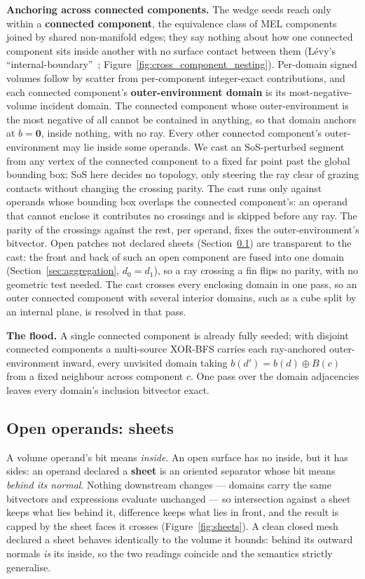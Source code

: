 \documentclass{egpubl}
\begin{document}
\textbf{Anchoring across connected components.} The wedge seeds reach only within a \textbf{connected component}, the equivalence class of MEL components joined by shared non-manifold edges; they say nothing about how one connected component sits inside another with no surface contact between them (L\'evy's ``internal-boundary''~\cite{Levy2025}; Figure~\ref{fig:cross_component_nesting}). Per-domain signed volumes follow by scatter from per-component integer-exact contributions, and each connected component's \textbf{outer-environment domain} is its most-negative-volume incident domain. The connected component whose outer-environment is the most negative of all cannot be contained in anything, so that domain anchors at $b = \mathbf{0}$, inside nothing, with no ray. Every other connected component's outer-environment may lie inside some operands. We cast an SoS-perturbed segment from any vertex of the connected component to a fixed far point past the global bounding box; SoS here decides no topology, only steering the ray clear of grazing contacts without changing the crossing parity. The cast runs only against operands whose bounding box overlaps the connected component's: an operand that cannot enclose it contributes no crossings and is skipped before any ray. The parity of the crossings against the rest, per operand, fixes the outer-environment's bitvector. Open patches not declared sheets (Section~\ref{sec:sheets}) are transparent to the cast: the front and back of such an open component are fused into one domain (Section~\ref{sec:aggregation}, $d_0 = d_1$), so a ray crossing a fin flips no parity, with no geometric test needed. The cast crosses every enclosing domain in one pass, so an outer connected component with several interior domains, such as a cube split by an internal plane, is resolved in that pass.

\textbf{The flood.} A single connected component is already fully seeded; with disjoint connected components a multi-source XOR-BFS carries each ray-anchored outer-environment inward, every unvisited domain taking $b(d') = b(d) \oplus B(c)$ from a fixed neighbour across component $c$. One pass over the domain adjacencies leaves every domain's inclusion bitvector exact.

\subsection{Open operands: sheets}
\label{sec:sheets}

A volume operand's bit means \emph{inside}. An open surface has no inside, but it has sides: an operand declared a \textbf{sheet} is an oriented separator whose bit means \emph{behind its normal}. Nothing downstream changes --- domains carry the same bitvectors and expressions evaluate unchanged --- so intersection against a sheet keeps what lies behind it, difference keeps what lies in front, and the result is capped by the sheet faces it crosses (Figure~\ref{fig:sheets}). A clean closed mesh declared a sheet behaves identically to the volume it bounds: behind its outward normals \emph{is} its inside, so the two readings coincide and the semantics strictly generalise.
\end{document}
